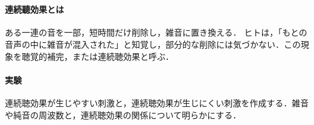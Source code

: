 \section{\kadaidb}\label{sec:\kadaidb}
\purpose
\paragraph{連続聽効果とは}
ある一連の音を一部，短時間だけ削除し，雑音に置き換える．
ヒトは，「もとの音声の中に雑音が混入された」と知覚し，部分的な削除には気づかない．この現象を聴覚的補完，または連続聴効果と呼ぶ．\cite[p.182-p.183]{感覚知覚心理学}
\paragraph{実験}
連続聴効果が生じやすい刺激と，連続聴効果が生じにくい刺激を作成する．雑音や純音の周波数と，連続聴効果の関係について明らかにする．
\method
